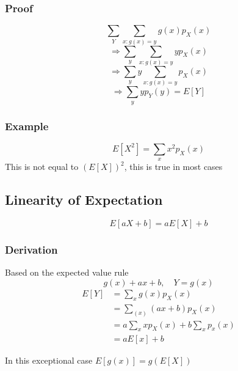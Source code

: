 \documentclass{article}
\begin{document}
\subsubsection*{Proof}
\[
\sum_{Y} \sum_{x:g(x) = y} g(x)p_X(x)
\]
\[
\Rightarrow \sum_{y} \sum_{x:g(x) = y} y p_X(x)
\]
\[
\Rightarrow \sum_{y} y \sum_{x:g(x) = y} p_X(x)
\]
\[
\Rightarrow \sum_{y} y p_Y(y) = E[Y]
\]

\subsubsection*{Example}
\[
E[X^2] = \sum_{x} x^2p_X(x)
\]
This is not equal to \((E[X])^2\), this is true in most cases

\subsection*{Linearity of Expectation}
\[
E[aX + b] = aE[X] + b
\]

\subsubsection*{Derivation}
Based on the expected value rule
\[
g(x) + ax+b, \quad Y = g(x)
\]
\begin{align*}
    E[Y] &= \sum_{x} g(x)p_X(x) \\
    &= \sum_(x) (ax+b)p_X(x) \\
    &= a\sum_{x} xp_X(x) + b \sum_{x}p_x(x) \\
    &= aE[x] + b
\end{align*}

In this exceptional case \(E[g(x)] = g(E[X])\)
\end{document}
